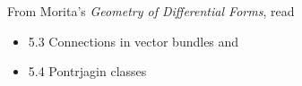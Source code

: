 \documentclass{homework}
\author{Jim Fowler}
\date{Week 12: Geometry}
\begin{document}
\maketitle

From Morita's \textit{Geometry of Differential Forms}, read
\begin{itemize}
\item 5.3 Connections in vector bundles and
\item 5.4 Pontrjagin classes
\end{itemize}
\end{document}
